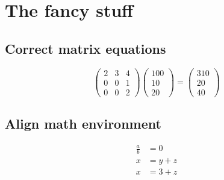 \documentclass{article}%
\begin{document}
%
\normalsize%
\section{The fancy stuff}%
\label{sec:Thefancystuff}%
\subsection{Correct matrix equations}%
\label{subsec:Correctmatrixequations}%
\[%
\begin{pmatrix}%
2&3&4\\%
0&0&1\\%
0&0&2%
\end{pmatrix} \begin{pmatrix}%
100\\%
10\\%
20%
\end{pmatrix} = \begin{pmatrix}%
310\\%
20\\%
40%
\end{pmatrix}%
\]

%
\subsection{Align math environment}%
\label{subsec:Alignmathenvironment}%
\begin{align}%
\frac{a}{b} &= 0 \\%
x &= y + z \\%
x &= 3 + z%
\end{align}
\end{document}
